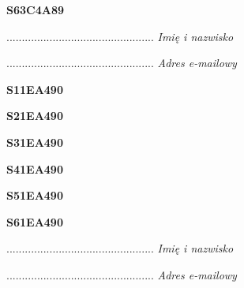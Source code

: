 \begin{turn}{90}\huge \textbf{S63C4A89}\end{turn}

\begin{turn}{90}\begin{minipage}{\linewidth} \vspace{20mm} ................................................  \textit{Imię i nazwisko}\end{minipage}\end{turn}

\begin{turn}{90}\begin{minipage}{\linewidth} \vspace{20mm} ................................................  \textit{Adres e-mailowy}\end{minipage}\end{turn}

\begin{turn}{90}\huge \textbf{S11EA490}\end{turn}

\begin{turn}{90}\huge \textbf{S21EA490}\end{turn}

\begin{turn}{90}\huge \textbf{S31EA490}\end{turn}

\begin{turn}{90}\huge \textbf{S41EA490}\end{turn}

\begin{turn}{90}\huge \textbf{S51EA490}\end{turn}

\begin{turn}{90}\huge \textbf{S61EA490}\end{turn}

\begin{turn}{90}\begin{minipage}{\linewidth} \vspace{20mm} ................................................  \textit{Imię i nazwisko}\end{minipage}\end{turn}

\begin{turn}{90}\begin{minipage}{\linewidth} \vspace{20mm} ................................................  \textit{Adres e-mailowy}\end{minipage}\end{turn}

